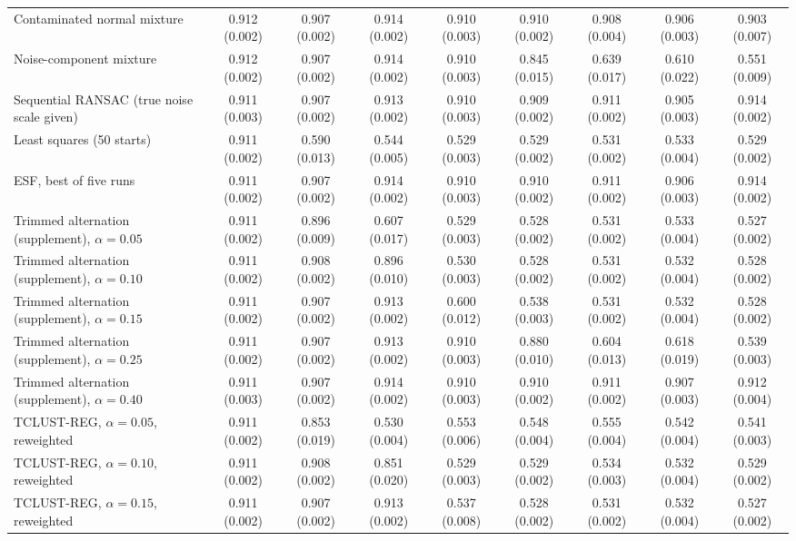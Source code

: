 \begin{table}[htbp]
{\begin{tabular}{lcccccccc}
Contaminated normal mixture & 0.912 (0.002) & 0.907 (0.002) & 0.914 (0.002) & 0.910 (0.003) & 0.910 (0.002) & 0.908 (0.004) & 0.906 (0.003) & 0.903 (0.007) \\
Noise-component mixture & 0.912 (0.002) & 0.907 (0.002) & 0.914 (0.002) & 0.910 (0.003) & 0.845 (0.015) & 0.639 (0.017) & 0.610 (0.022) & 0.551 (0.009) \\
Sequential RANSAC (true noise scale given) & 0.911 (0.003) & 0.907 (0.002) & 0.913 (0.002) & 0.910 (0.003) & 0.909 (0.002) & 0.911 (0.002) & 0.905 (0.003) & 0.914 (0.002) \\
Least squares (50 starts) & 0.911 (0.002) & 0.590 (0.013) & 0.544 (0.005) & 0.529 (0.003) & 0.529 (0.002) & 0.531 (0.002) & 0.533 (0.004) & 0.529 (0.002) \\
ESF, best of five runs & 0.911 (0.002) & 0.907 (0.002) & 0.914 (0.002) & 0.910 (0.003) & 0.910 (0.002) & 0.911 (0.002) & 0.906 (0.003) & 0.914 (0.002) \\
Trimmed alternation (supplement), $\alpha=0.05$ & 0.911 (0.002) & 0.896 (0.009) & 0.607 (0.017) & 0.529 (0.003) & 0.528 (0.002) & 0.531 (0.002) & 0.533 (0.004) & 0.527 (0.002) \\
Trimmed alternation (supplement), $\alpha=0.10$ & 0.911 (0.002) & 0.908 (0.002) & 0.896 (0.010) & 0.530 (0.003) & 0.528 (0.002) & 0.531 (0.002) & 0.532 (0.004) & 0.528 (0.002) \\
Trimmed alternation (supplement), $\alpha=0.15$ & 0.911 (0.002) & 0.907 (0.002) & 0.913 (0.002) & 0.600 (0.012) & 0.538 (0.003) & 0.531 (0.002) & 0.532 (0.004) & 0.528 (0.002) \\
Trimmed alternation (supplement), $\alpha=0.25$ & 0.911 (0.002) & 0.907 (0.002) & 0.913 (0.002) & 0.910 (0.003) & 0.880 (0.010) & 0.604 (0.013) & 0.618 (0.019) & 0.539 (0.003) \\
Trimmed alternation (supplement), $\alpha=0.40$ & 0.911 (0.003) & 0.907 (0.002) & 0.914 (0.002) & 0.910 (0.003) & 0.910 (0.002) & 0.911 (0.002) & 0.907 (0.003) & 0.912 (0.004) \\
TCLUST-REG, $\alpha=0.05$, reweighted & 0.911 (0.002) & 0.853 (0.019) & 0.530 (0.004) & 0.553 (0.006) & 0.548 (0.004) & 0.555 (0.004) & 0.542 (0.004) & 0.541 (0.003) \\
TCLUST-REG, $\alpha=0.10$, reweighted & 0.911 (0.002) & 0.908 (0.002) & 0.851 (0.020) & 0.529 (0.003) & 0.529 (0.002) & 0.534 (0.003) & 0.532 (0.004) & 0.529 (0.002) \\
TCLUST-REG, $\alpha=0.15$, reweighted & 0.911 (0.002) & 0.907 (0.002) & 0.913 (0.002) & 0.537 (0.008) & 0.528 (0.002) & 0.531 (0.002) & 0.532 (0.004) & 0.527 (0.002) \\
\bottomrule
\end{tabular}}
\end{table}

